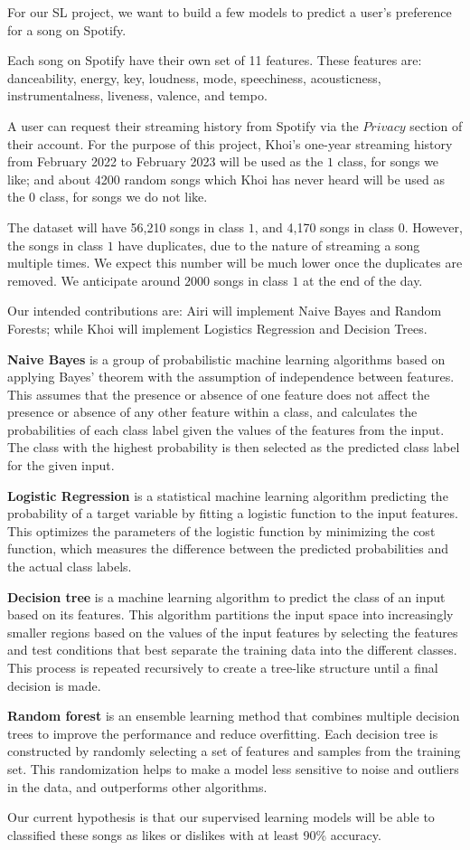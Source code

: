 For our SL project, we want to build a few models to predict a user's preference for a song on Spotify. 

Each song on Spotify have their own set of 11 features. These features are: danceability, energy, key, loudness,
mode, speechiness, acousticness, instrumentalness, liveness, valence, and tempo.

A user can request their streaming history from Spotify via the $Privacy$ section of their account. For the purpose
of this project, Khoi's one-year streaming history from February 2022 to February 2023 will be used as the $1$ class, for songs we like; and about
4200 random songs which Khoi has never heard will be used as the $0$ class, for songs we do not like.

The dataset will have 56,210 songs in class $1$, and 4,170 songs in class $0$. However, the songs in class $1$ have duplicates, due to the nature of streaming
a song multiple times. We expect this number will be much lower once the duplicates are removed. We anticipate around $2000$ songs in class $1$ at the end of the day.

Our intended contributions are: Airi will implement Naive Bayes and Random Forests; while Khoi will implement Logistics Regression and Decision Trees.

\textbf{Naive Bayes} is a group of probabilistic machine learning algorithms based on applying Bayes' theorem with the assumption of independence between features.
This assumes that the presence or absence of one feature does not affect the presence or absence of any other feature within a class,
and calculates the probabilities of each class label given the values of the features from the input. The class with the highest probability is then selected as the predicted class label for the given input.

\textbf{Logistic Regression} is a statistical machine learning algorithm predicting the probability of a target variable by fitting a logistic function to the input features. 
This optimizes the parameters of the logistic function by minimizing the cost function, which measures the difference between the predicted probabilities and the actual class labels.

\textbf{Decision tree} is a machine learning algorithm to predict the class of an input based on its features.  
This algorithm partitions the input space into increasingly smaller regions based on the values of the input features by selecting the features and test conditions that best separate the training data into the different classes.
This process is repeated recursively to create a tree-like structure until a final decision is made. 

\textbf{Random forest} is an ensemble learning method that combines multiple decision trees to improve the performance and reduce overfitting. Each decision tree is constructed by randomly selecting a set of features and samples from the training set. 
This randomization helps to make a model less sensitive to noise and outliers in the data, and outperforms other algorithms. 

Our current hypothesis is that our supervised learning models will be able to classified these songs as likes or dislikes with at least 90\% accuracy.